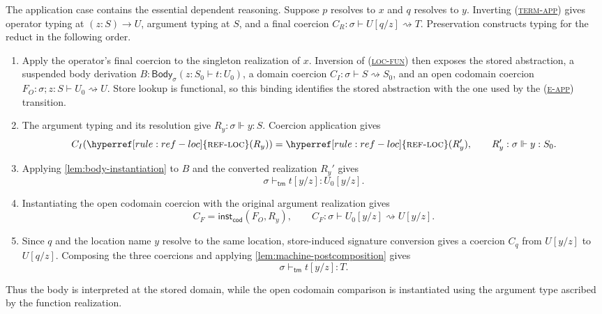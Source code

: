 \documentclass[acmsmall,screen,nonacm]{acmart}
\newcommand{\ruleuse}[1]{%
  \hyperref[rule:#1]{\textsc{#1}}}
\newcommand{\ruleref}[1]{%
  \textsc{(\hyperref[rule:#1]{#1})}}
\newcommand{\subst}[3]{#1[#2/#3]}
\newcommand{\realizes}{\Vdash}
\newcommand{\coerce}{\mathrel{\rightsquigarrow}}
\newcommand{\bodycl}[5]{%
  \mathsf{Body}_{#1}(#2\!:\!#3\vdash #4:#5)}
\newcommand{\action}[2]{#1(#2)}
\newcommand{\forcecod}[2]{\mathsf{inst}_{\mathsf{cod}}(#1,#2)}
\begin{document}
The application case contains the essential dependent reasoning. Suppose
\(p\) resolves to \(x\) and \(q\) resolves to \(y\). Inverting
\ruleref{term-app} gives operator typing at \((z:S)\to U\), argument typing
at \(S\), and a final coercion
\(C_R:\sigma\vdash\subst{U}{q}{z}\coerce T\). Preservation constructs
typing for the reduct in the following order.
\begin{enumerate}
\item Apply the operator's final coercion to the singleton realization of
  \(x\). Inversion of \ruleref{loc-fun} then exposes the stored abstraction,
  a suspended body derivation \(B:\bodycl{\sigma}{z}{S_0}{t}{U_0}\), a domain
  coercion \(C_I:\sigma\vdash S\coerce S_0\), and an open codomain coercion
  \(F_O:\sigma;z:S\vdash U_0\coerce U\). Store lookup is functional, so
  this binding identifies the stored abstraction with the one used by the
  \ruleref{e-app} transition.
\item The argument typing and its resolution give
  \(R_y:\sigma\realizes y:S\). Coercion application gives
  \[
    \action{C_I}{\ruleuse{ref-loc}(R_y)}=\ruleuse{ref-loc}(R_y'),
    \qquad R_y':\sigma\realizes y:S_0.
  \]
\item Applying \cref{lem:body-instantiation} to \(B\) and the converted
  realization \(R_y'\) gives
  \[
    \sigma\vdash_{\mathsf{tm}}\subst{t}{y}{z}:\subst{U_0}{y}{z}.
  \]
\item Instantiating the open codomain coercion with the original argument
  realization gives
  \[
    C_F=\forcecod{F_O}{R_y},
    \qquad
    C_F:\sigma\vdash\subst{U_0}{y}{z}\coerce\subst{U}{y}{z}.
  \]
\item Since \(q\) and the location name \(y\) resolve to the same location,
  store-induced signature conversion gives a coercion \(C_q\) from
  \(\subst{U}{y}{z}\) to \(\subst{U}{q}{z}\). Composing the three
  coercions and applying \cref{lem:machine-postcomposition} gives
  \[
    \sigma\vdash_{\mathsf{tm}}\subst{t}{y}{z}:T.
  \]
\end{enumerate}
Thus the body is interpreted at the stored domain, while the open codomain
comparison is instantiated using the argument type ascribed by the function
realization.
\end{document}
